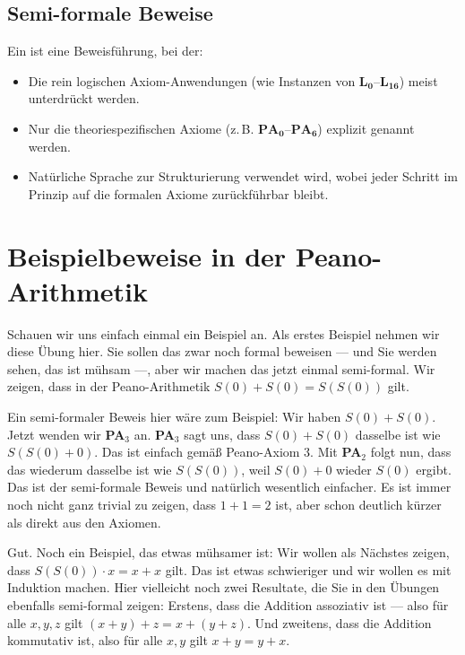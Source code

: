 \subsection{Semi-formale Beweise}
\begin{math-stroke}
\begin{definition}
Ein  ist eine Beweisführung, bei der:
\begin{itemize}
    \item Die rein logischen Axiom-Anwendungen (wie Instanzen von $\mathbf{L_0}$--$\mathbf{L_{16}}$) meist unterdrückt werden.
    \item Nur die theoriespezifischen Axiome (z.\,B. $\mathbf{PA_0}$--$\mathbf{PA_6}$) explizit genannt werden.
    \item Natürliche Sprache zur Strukturierung verwendet wird, wobei jeder Schritt im Prinzip auf die formalen Axiome zurückführbar bleibt.
\end{itemize}
\end{definition}
\end{math-stroke}

\section{Beispielbeweise in der Peano-Arithmetik}

\begin{spoken-clean}[00:20:50 - 00:24:50]
Schauen wir uns einfach einmal ein Beispiel an. Als erstes Beispiel nehmen wir diese Übung hier. Sie sollen das zwar noch formal beweisen --- und Sie werden sehen, das ist mühsam ---, aber wir machen das jetzt einmal semi-formal. Wir zeigen, dass in der Peano-Arithmetik $S(0) + S(0) = S(S(0))$ gilt.

Ein semi-formaler Beweis hier wäre zum Beispiel: Wir haben $S(0) + S(0)$. Jetzt wenden wir \textbf{PA$_3$} an. \textbf{PA$_3$} sagt uns, dass $S(0) + S(0)$ dasselbe ist wie $S(S(0) + 0)$. Das ist einfach gemäß Peano-Axiom 3. Mit \textbf{PA$_2$} folgt nun, dass das wiederum dasselbe ist wie $S(S(0))$, weil $S(0) + 0$ wieder $S(0)$ ergibt. Das ist der semi-formale Beweis und natürlich wesentlich einfacher. Es ist immer noch nicht ganz trivial zu zeigen, dass $1 + 1 = 2$ ist, aber schon deutlich kürzer als direkt aus den Axiomen.

Gut. Noch ein Beispiel, das etwas mühsamer ist: Wir wollen als Nächstes zeigen, dass $S(S(0)) \cdot x = x + x$ gilt. Das ist etwas schwieriger und wir wollen es mit Induktion machen. Hier vielleicht noch zwei Resultate, die Sie in den Übungen ebenfalls semi-formal zeigen: Erstens, dass die Addition assoziativ ist --- also für alle $x, y, z$ gilt $(x + y) + z = x + (y + z)$. Und zweitens, dass die Addition kommutativ ist, also für alle $x, y$ gilt $x + y = y + x$.
\end{spoken-clean}

